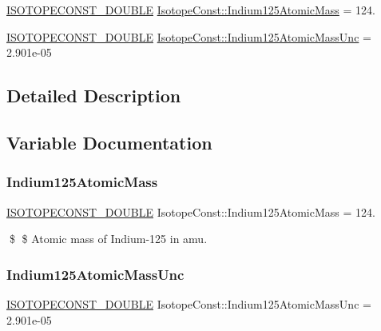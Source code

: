 \begin{DoxyCompactItemize}
\item 
\mbox{\hyperlink{group___isotope_const-_macros_ga8f45a7272ce02c0b4c65c44636ed719a}{I\+S\+O\+T\+O\+P\+E\+C\+O\+N\+S\+T\+\_\+\+D\+O\+U\+B\+LE}} \mbox{\hyperlink{group___isotope_const-_indium-_in125_ga5b944a87a1ad4923ca0328e5f8b70076}{Isotope\+Const\+::\+Indium125\+Atomic\+Mass}} = 124.
\item 
\mbox{\hyperlink{group___isotope_const-_macros_ga8f45a7272ce02c0b4c65c44636ed719a}{I\+S\+O\+T\+O\+P\+E\+C\+O\+N\+S\+T\+\_\+\+D\+O\+U\+B\+LE}} \mbox{\hyperlink{group___isotope_const-_indium-_in125_gac9986e26df637b21d44d8256ebe3379b}{Isotope\+Const\+::\+Indium125\+Atomic\+Mass\+Unc}} = 2.\+901e-\/05
\end{DoxyCompactItemize}


\subsection{Detailed Description}


\subsection{Variable Documentation}
\mbox{\label{group___isotope_const-_indium-_in125_ga5b944a87a1ad4923ca0328e5f8b70076}} 
\subsubsection{\texorpdfstring{Indium125\+Atomic\+Mass}{Indium125AtomicMass}}
{\footnotesize\ttfamily \mbox{\hyperlink{group___isotope_const-_macros_ga8f45a7272ce02c0b4c65c44636ed719a}{I\+S\+O\+T\+O\+P\+E\+C\+O\+N\+S\+T\+\_\+\+D\+O\+U\+B\+LE}} Isotope\+Const\+::\+Indium125\+Atomic\+Mass = 124.}

\$ \$ Atomic mass of Indium-\/125 in amu. \mbox{\label{group___isotope_const-_indium-_in125_gac9986e26df637b21d44d8256ebe3379b}} 
\subsubsection{\texorpdfstring{Indium125\+Atomic\+Mass\+Unc}{Indium125AtomicMassUnc}}
{\footnotesize\ttfamily \mbox{\hyperlink{group___isotope_const-_macros_ga8f45a7272ce02c0b4c65c44636ed719a}{I\+S\+O\+T\+O\+P\+E\+C\+O\+N\+S\+T\+\_\+\+D\+O\+U\+B\+LE}} Isotope\+Const\+::\+Indium125\+Atomic\+Mass\+Unc = 2.\+901e-\/05}

